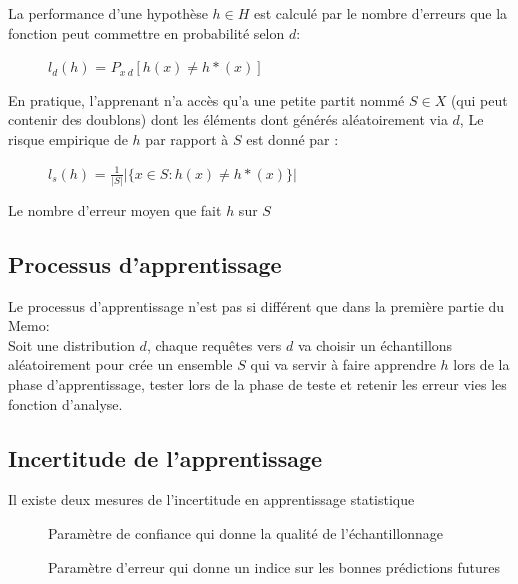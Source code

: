 La performance d'une hypothèse $h \in H$ est calculé par le nombre d'erreurs que la fonction peut commettre en probabilité selon $d$:
\begin{description}
\item[] $l_d(h)$ = $P_{x~d}[h(x) \neq h*(x)]$
\end{description}

En pratique, l'apprenant n'a accès qu'a une petite partit nommé $S \in X$ (qui peut contenir des doublons) dont les éléments dont générés aléatoirement via $d$, Le risque empirique de $h$ par rapport à $S$ est donné par :
\begin{description}
\item[] $l_s(h)$ = $\frac{1}{|S|} |\{x \in S : h(x) \neq h*(x)\}|$
\end{description}
Le nombre d'erreur moyen que fait $h$ sur $S$\\

\subsection{Processus d'apprentissage}

Le processus d'apprentissage n'est pas si différent que dans la première partie du Memo:\\

Soit une distribution $d$, chaque requêtes vers $d$ va choisir un échantillons aléatoirement pour crée un ensemble $S$ qui va servir à faire apprendre $h$ lors de la phase d'apprentissage, tester lors de la phase de teste et retenir les erreur vies les fonction d'analyse.\\

\subsection{Incertitude de l'apprentissage}

Il existe deux mesures de l'incertitude en apprentissage statistique
\begin{description}
\item[] Paramètre de confiance qui donne la qualité de l'échantillonnage
\item[] Paramètre d'erreur qui donne un indice sur les bonnes prédictions futures
\end{description}

